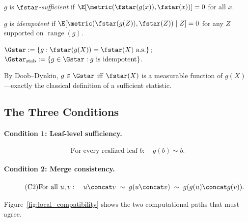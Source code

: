 \begin{definition}[Sufficiency]\label{def:oracle-suff}
$g$ is \emph{$\fstar$-sufficient} if $\E[\metric(\fstar(g(x)), \fstar(x))] = 0$ for all $x$.
\end{definition}

\begin{definition}[Idempotence]\label{def:idempotence}
$g$ is \emph{idempotent} if $\E[\metric(\fstar(g(Z)), \fstar(Z)) \mid Z] = 0$ for any $Z$ supported on $\operatorname{range}(g)$.
\end{definition}

\begin{definition}\label{def:gstar-classes}
$\Gstar := \{g : \fstar(g(X)) = \fstar(X) \text{ a.s.}\}$; \quad $\Gstar_{\mathrm{stab}} := \{g \in \Gstar : g \text{ is idempotent}\}$.
\end{definition}

By Doob--Dynkin, $g \in \Gstar$ iff $\fstar(X)$ is a measurable function of $g(X)$---exactly the classical definition of a sufficient statistic.

\subsection{The Three Conditions}

\paragraph{Condition 1: Leaf-level sufficiency.}
\begin{equation}\tag{C1}\label{eq:leaf_sufficiency}
\text{For every realized leaf } b: \quad g(b) \sim b.
\end{equation}

\paragraph{Condition 2: Merge consistency.}
\begin{equation}\tag{C2}\label{eq:leaf_compatibility}
\text{For all } u, v: \quad
u \concat v \;\sim\; g(u \concat v) \;\sim\; g(g(u) \concat g(v)).
\end{equation}

Figure~\ref{fig:local_compatibility} shows the two computational paths that must agree.

